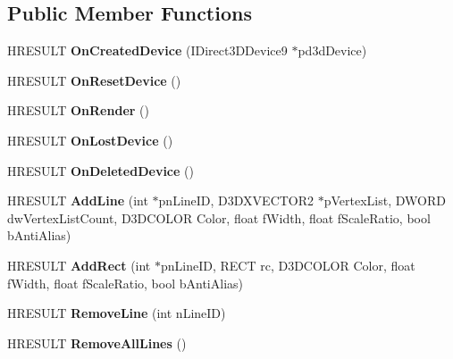 \subsection*{Public Member Functions}
\begin{DoxyCompactItemize}
\item 
\hypertarget{class_c_d_x_u_t_line_manager_ae5dc0839102d2daa1193f3c377af0833}{H\+R\+E\+S\+U\+L\+T {\bfseries On\+Created\+Device} (I\+Direct3\+D\+Device9 $\ast$pd3d\+Device)}\label{class_c_d_x_u_t_line_manager_ae5dc0839102d2daa1193f3c377af0833}

\item 
\hypertarget{class_c_d_x_u_t_line_manager_af0a79d23ae9c18275b57c59c36828ca8}{H\+R\+E\+S\+U\+L\+T {\bfseries On\+Reset\+Device} ()}\label{class_c_d_x_u_t_line_manager_af0a79d23ae9c18275b57c59c36828ca8}

\item 
\hypertarget{class_c_d_x_u_t_line_manager_a7bac9b5284fe576db806cba8423b2eda}{H\+R\+E\+S\+U\+L\+T {\bfseries On\+Render} ()}\label{class_c_d_x_u_t_line_manager_a7bac9b5284fe576db806cba8423b2eda}

\item 
\hypertarget{class_c_d_x_u_t_line_manager_a609fbd2215c2c4fbb02bf42d98686346}{H\+R\+E\+S\+U\+L\+T {\bfseries On\+Lost\+Device} ()}\label{class_c_d_x_u_t_line_manager_a609fbd2215c2c4fbb02bf42d98686346}

\item 
\hypertarget{class_c_d_x_u_t_line_manager_a4ad6b10373fe6179783f3805379643c4}{H\+R\+E\+S\+U\+L\+T {\bfseries On\+Deleted\+Device} ()}\label{class_c_d_x_u_t_line_manager_a4ad6b10373fe6179783f3805379643c4}

\item 
\hypertarget{class_c_d_x_u_t_line_manager_a943c26c0d740ebcb58e24b1a8f8c70de}{H\+R\+E\+S\+U\+L\+T {\bfseries Add\+Line} (int $\ast$pn\+Line\+I\+D, D3\+D\+X\+V\+E\+C\+T\+O\+R2 $\ast$p\+Vertex\+List, D\+W\+O\+R\+D dw\+Vertex\+List\+Count, D3\+D\+C\+O\+L\+O\+R Color, float f\+Width, float f\+Scale\+Ratio, bool b\+Anti\+Alias)}\label{class_c_d_x_u_t_line_manager_a943c26c0d740ebcb58e24b1a8f8c70de}

\item 
\hypertarget{class_c_d_x_u_t_line_manager_ab6a0ff03d7acdabd30ff92c92e696b65}{H\+R\+E\+S\+U\+L\+T {\bfseries Add\+Rect} (int $\ast$pn\+Line\+I\+D, R\+E\+C\+T rc, D3\+D\+C\+O\+L\+O\+R Color, float f\+Width, float f\+Scale\+Ratio, bool b\+Anti\+Alias)}\label{class_c_d_x_u_t_line_manager_ab6a0ff03d7acdabd30ff92c92e696b65}

\item 
\hypertarget{class_c_d_x_u_t_line_manager_aabb8acc5fc21c6a283575031fe49ed90}{H\+R\+E\+S\+U\+L\+T {\bfseries Remove\+Line} (int n\+Line\+I\+D)}\label{class_c_d_x_u_t_line_manager_aabb8acc5fc21c6a283575031fe49ed90}

\item 
\hypertarget{class_c_d_x_u_t_line_manager_ad07600de77c719bb97f1ee004387d241}{H\+R\+E\+S\+U\+L\+T {\bfseries Remove\+All\+Lines} ()}\label{class_c_d_x_u_t_line_manager_ad07600de77c719bb97f1ee004387d241}

\end{DoxyCompactItemize}
